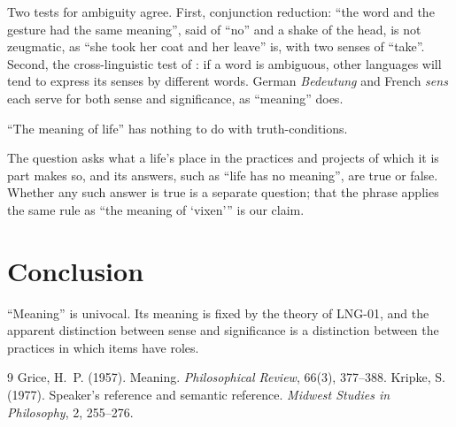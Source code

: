 \documentclass{situationist-preprint}
\begin{document}
Two tests for ambiguity agree. First, conjunction reduction: \enquote{the word and the gesture had the same meaning}, said of \enquote{no} and a shake of the head, is not zeugmatic, as \enquote{she took her coat and her leave} is, with two senses of \enquote{take}. Second, the cross-linguistic test of \citet{Kripke1977}: if a word is ambiguous, other languages will tend to express its senses by different words. German \emph{Bedeutung} and French \emph{sens} each serve for both sense and significance, as \enquote{meaning} does.

\begin{objection}
\enquote{The meaning of life} has nothing to do with truth-conditions.
\end{objection}

\begin{reply}
The question asks what a life's place in the practices and projects of which it is part makes so, and its answers, such as \enquote{life has no meaning}, are true or false. Whether any such answer is true is a separate question; that the phrase applies the same rule as \enquote{the meaning of \enquote{vixen}} is our claim.
\end{reply}

\section{Conclusion}

\enquote{Meaning} is univocal. Its meaning is fixed by the theory of LNG-01, and the apparent distinction between sense and significance is a distinction between the practices in which items have roles.

\begin{thebibliography}{9}\small
{} Grice, H.~P. (1957). Meaning. \emph{Philosophical Review}, 66(3), 377--388.
 Kripke, S. (1977). Speaker's reference and semantic reference. \emph{Midwest Studies in Philosophy}, 2, 255--276.
\end{thebibliography}
\end{document}
